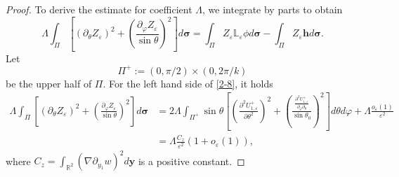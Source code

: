 \documentclass[12pt,reqno]{amsart}
\numberwithin{equation}{section}
\theoremstyle{definition}
\theoremstyle{remark}
\begin{document}
\begin{proof}
	To derive the estimate for coefficient $\Lambda$, we integrate by parts to obtain
	\begin{equation}\label{2-8}
		\Lambda\int_{\Pi} \left[(\partial_\theta Z_\varepsilon)^2+\left(\frac{\partial_\varphi Z_\varepsilon}{\sin\theta}\right)^2\right]d\boldsymbol \sigma=\int_{\Pi}Z_\varepsilon\mathbb L_\varepsilon\phi d\boldsymbol \sigma-\int_{\Pi} Z_\varepsilon\mathbf h d\boldsymbol \sigma.
	\end{equation}
Let 
	$$\Pi^+:=(0,\pi/2)\times\left(0,2\pi/k\right)$$ 
	be the upper half of $\Pi$. For the left hand side of \eqref{2-8}, it holds
	\begin{align*}
		\Lambda\int_{\Pi} \left[(\partial_\theta Z_\varepsilon)^2+\left(\frac{\partial_\varphi Z_\varepsilon}{\sin\theta}\right)^2\right]d\boldsymbol \sigma
		&=2\Lambda\int_{\Pi^+} \sin\theta \left[\left(\frac{\partial^2 U^+_{1,\varepsilon}}{\partial \theta^2}\right)^2+\left(\frac{\frac{\partial^2U_{1,\varepsilon}^+}{\partial_\varphi\partial_\theta}}{\sin\theta_0}\right)^2\right]d\theta d\varphi+\Lambda\frac{o_\varepsilon(1)}{\varepsilon^2}\\
		&=\Lambda\frac{C_z}{\varepsilon^2}(1+o_\varepsilon(1)),
	\end{align*}
	where $C_z=\int_{\mathbb R^2}(\nabla \partial_{y_1}w)^2 d\boldsymbol y$ is a positive constant.
	

\end{proof}
\end{document}
